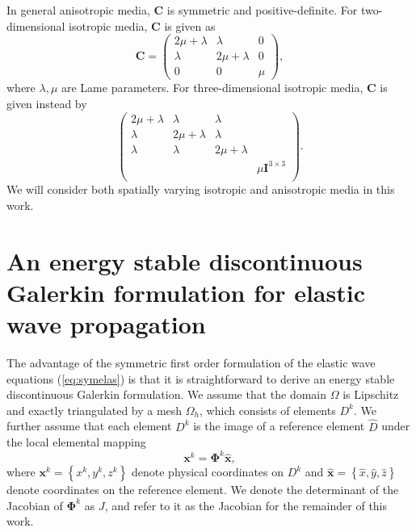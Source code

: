\documentclass{siamart0216}
\newcommand{\LRp}[1]{\left( #1 \right)}
\newcommand{\LRc}[1]{\left\{ #1 \right\}}
\begin{document}
In general anisotropic media, $\bm{C}$ is symmetric and positive-definite.  For two-dimensional isotropic media, $\bm{C}$ is given as
\[
\bm{C}= \LRp{
\begin{array}{ccc}
2\mu+\lambda  &  \lambda  &     0\\
\lambda &       2\mu+\lambda &      0\\
0 & 0 & \mu
\end{array}}, 
\]
where $\lambda,\mu$ are Lame parameters.  For three-dimensional isotropic media, $\bm{C}$ is given instead by
\[
\LRp{\begin{array}{cccc}
2\mu+\lambda  &  \lambda  &     \lambda   & \\
\lambda &   2\mu+\lambda & \lambda   &  \\
\lambda & \lambda &   2\mu+\lambda &    \\
 &   &    & {\mu}\bm{I}^{3\times3} \\
\end{array}}.  
\]
We will consider both spatially varying isotropic and anisotropic media in this work.  

\section{An energy stable discontinuous Galerkin formulation for elastic wave propagation}
\label{sec:dgform}
The advantage of the symmetric first order formulation of the elastic wave equations (\ref{eq:symelas}) is that it is straightforward to derive an energy stable discontinuous Galerkin formulation.  We assume that the domain $\Omega$ is Lipschitz and exactly triangulated by a mesh $\Omega_h$, which consists of elements $D^k$.  We further assume that each element $D^k$ is the image of a reference element $\widehat{D}$ under the local elemental mapping 
\[
\bm{x}^k = \bm{\Phi}^k \widehat{\bm{x}},
\]
where $\bm{x}^k = \LRc{x^k,y^k,z^k}$ denote physical coordinates on $D^k$ and $\widehat{\bm{x}} = \LRc{\widehat{x},\widehat{y},\widehat{z}}$ denote coordinates on the reference element.  We denote the determinant of the Jacobian of $\bm{\Phi}^k$ as $J$, and refer to it as the Jacobian for the remainder of this work.  
\end{document}
